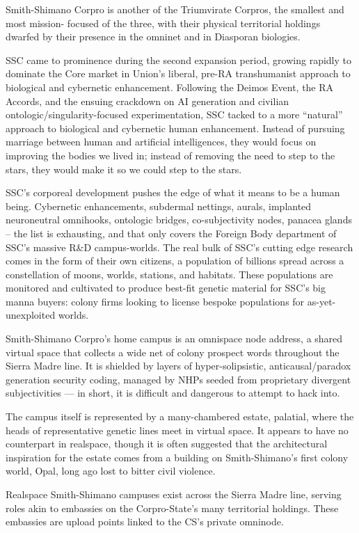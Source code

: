 Smith-Shimano Corpro is another of the Triumvirate Corpros, the smallest and most mission-
focused of the three, with their physical territorial holdings dwarfed by their presence in the
omninet and in Diasporan biologies.

SSC came to prominence during the second expansion period, growing rapidly to dominate the
Core market in Union’s liberal, pre-RA transhumanist approach to biological and cybernetic
enhancement. Following the Deimos Event, the RA Accords, and the ensuing crackdown on AI
generation and civilian ontologic/singularity-focused experimentation, SSC tacked to a more
“natural” approach to biological and cybernetic human enhancement. Instead of pursuing
marriage between human and artificial intelligences, they would focus on improving the bodies
we lived in; instead of removing the need to step to the stars, they would make it so we could
step to the stars.

SSC’s corporeal development pushes the edge of what it means to be a human being.
Cybernetic enhancements, subdermal nettings, aurals, implanted neuroneutral omnihooks,
ontologic bridges, co-subjectivity nodes, panacea glands -- the list is exhausting, and that only
covers the Foreign Body department of SSC’s massive R\&D campus-worlds. The real bulk of
SSC’s cutting edge research comes in the form of their own citizens, a population of billions
spread across a constellation of moons, worlds, stations, and habitats. These populations are
monitored and cultivated to produce best-fit genetic material for SSC’s big manna buyers:
colony firms looking to license bespoke populations for as-yet-unexploited worlds.

Smith-Shimano Corpro’s home campus is an omnispace node address, a shared virtual space
that collects a wide net of colony prospect words throughout the Sierra Madre line. It is shielded
by layers of hyper-solipsistic, anticausal/paradox generation security coding, managed by NHPs
seeded from proprietary divergent subjectivities — in short, it is difficult and dangerous to
attempt to hack into.

The campus itself is represented by a many-chambered estate, palatial, where the heads of
representative genetic lines meet in virtual space. It appears to have no counterpart in realspace,
though it is often suggested that the architectural inspiration for the estate comes from a building
on Smith-Shimano’s first colony world, Opal, long ago lost to bitter civil violence.

Realspace Smith-Shimano campuses exist across the Sierra Madre line, serving roles akin to
embassies on the Corpro-State’s many territorial holdings. These embassies are upload points
linked to the CS’s private omninode.

